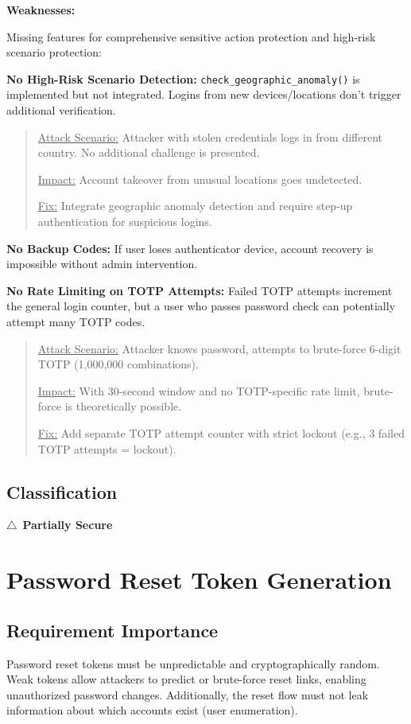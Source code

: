\documentclass[11pt,a4paper]{article}
\newcommand{\partiallysecure}{\textcolor{warningorange}{$\triangle$~\textbf{Partially Secure}}}
\begin{document}
\textbf{Weaknesses:}

Missing features for comprehensive sensitive action protection and high-risk scenario protection:

\textbf{No High-Risk Scenario Detection:} \texttt{check\_geographic\_anomaly()} is implemented but not integrated. Logins from new devices/locations don't trigger additional verification.

\begin{quote}
\underline{Attack Scenario:} Attacker with stolen credentials logs in from different country. No additional challenge is presented.

\underline{Impact:} Account takeover from unusual locations goes undetected.

\underline{Fix:} Integrate geographic anomaly detection and require step-up authentication for suspicious logins.
\end{quote}

\textbf{No Backup Codes:} If user loses authenticator device, account recovery is impossible without admin intervention.

\textbf{No Rate Limiting on TOTP Attempts:} Failed TOTP attempts increment the general login counter, but a user who passes password check can potentially attempt many TOTP codes.

\begin{quote}
\underline{Attack Scenario:} Attacker knows password, attempts to brute-force 6-digit TOTP (1,000,000 combinations).

\underline{Impact:} With 30-second window and no TOTP-specific rate limit, brute-force is theoretically possible.

\underline{Fix:} Add separate TOTP attempt counter with strict lockout (e.g., 3 failed TOTP attempts = lockout).
\end{quote}

\subsection{Classification}
\partiallysecure

\newpage
\section{Password Reset Token Generation}

\subsection{Requirement Importance}
Password reset tokens must be unpredictable and cryptographically random. Weak tokens allow attackers to predict or brute-force reset links, enabling unauthorized password changes. Additionally, the reset flow must not leak information about which accounts exist (user enumeration).
\end{document}

